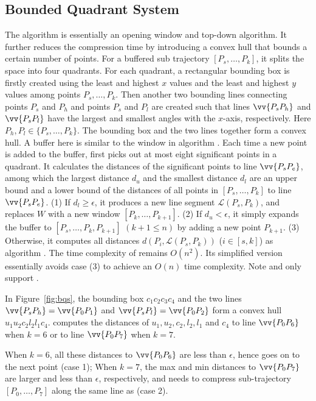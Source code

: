 \subsection{Bounded Quadrant System}
The \bqsa algorithm \cite{Liu:BQS} is essentially an opening window and top-down algorithm\cite{Meratnia:Spatiotemporal}. It further reduces the compression time by introducing a convex hull that bounds a certain number of points. For a buffered sub trajectory $[P_s, \ldots, P_k]$, it splits the space into four quadrants. For each quadrant, a rectangular bounding box is firstly created using the least and highest $x$ values and the least and highest $y$ values among points $P_s,\ldots,P_k$. Then another two bounding lines connecting points $P_s$ and $P_{h}$ and points $P_s$ and $P_{l}$ are created such that lines $\vv{P_sP_{h}}$ and $\vv{P_sP_{l}}$ have the largest and smallest angles with the $x$-axis, respectively.
Here $P_{h},P_{l} \in\{P_s,\ldots,P_k\}$. The bounding box and the two lines together form a convex hull.
A buffer here is similar to the window in algorithm \opwa.
Each time a new point is added to the buffer, \bqsa first picks out at most eight significant points in a quadrant. It calculates the distances of the significant points to line $\vv{P_sP_e}$, among which the largest distance $d_{u}$ and the smallest distance $d_l$ are an upper bound and  a lower bound of the distances of all points in $[P_s, \ldots, P_k]$ to line $\vv{P_sP_e}$.
(1) If $d_l\ge \epsilon$, it produces a new line segment $\mathcal{L}(P_{s}, P_{k})$, and replaces $W$ with a new window $[P_{k},\ldots,P_{k+1}]$.
(2) If $d_u < \epsilon$, it simply expands the buffer to $[P_s, \ldots, P_k, P_{k+1}]$ $(k+1\le n)$ by adding a new point $P_{k+1}$.
(3) Otherwise, it computes all distances $d(P_i, {\mathcal{L}(P_s,P_k)})$ ($i\in[s, k]$) as algorithm \dpa.
The time complexity of \bqsa remains $O(n^2)$.
Its simplified version \fbqsa essentially avoids case (3) to achieve an $O(n)$ time complexity.
Note \bqsa and \fbqsa only support \ped.

\begin{example}
\label{exm-alg-bqs}
In Figure~\ref{fig:bqs}, the bounding box $c_1c_2c_3c_4$ and the two lines $\vv{P_sP_{h}} = \vv{P_0P_1}$ and $\vv{P_sP_{l}} = \vv{P_0P_2}$ form a convex hull $u_1u_2c_2l_2l_1c_4$. \bqsa computes the distances of $u_1,u_2,c_2,l_2,l_1$ and $c_4$ to line $\vv{P_0P_6}$ when $k=6$ or to line $\vv{P_0P_7}$ when $k=7$.

When $k=6$, all these distances to $\vv{P_0P_6}$  are less than $\epsilon$, hence \bqsa goes on to the next point (case 1); When $k=7$,
the max and min distances to $\vv{P_0P_7}$ are larger and less than $\epsilon$, respectively, and \bqsa needs to compress sub-trajectory $[P_0, \ldots, P_7]$ along the same line as \dpa (case 2).
\end{example}




